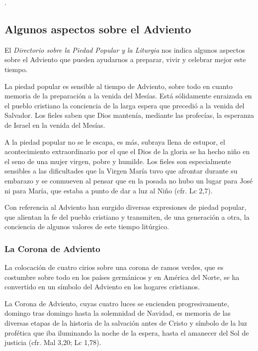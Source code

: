 \begin{introstyle}
	.
	
	\subsection{Algunos aspectos sobre el Adviento}
	
	El \emph{Directorio sobre la Piedad Popular y la Liturgia} nos indica algunos aspectos sobre el Adviento que pueden ayudarnos a preparar, vivir y celebrar mejor este tiempo\label{fn8}.
	
	La piedad popular es sensible al tiempo de Adviento, sobre todo en cuanto memoria de la preparación a la venida del Mesías. Está sólidamente enraizada en el pueblo cristiano la conciencia de la larga espera que precedió a la venida del Salvador. Los fieles saben que Dios
	mantenía, mediante las profecías, la esperanza de Israel en la venida del Mesías.
	
	A la piedad popular no se le escapa, es más, subraya llena de estupor, el acontecimiento extraordinario por el que el Dios de la gloria se ha hecho niño en el seno de una mujer virgen, pobre y humilde. Los fieles	son especialmente sensibles a las dificultades que la Virgen María tuvo que afrontar durante su embarazo y se conmueven al pensar que en la
	posada no hubo un lugar para José ni para María, que estaba a punto de dar a luz al Niño (cfr. Lc 2,7).
	
	Con referencia al Adviento han surgido diversas expresiones de piedad popular, que alientan la fe del pueblo cristiano y transmiten, de una generación a otra, la conciencia de algunos valores de este tiempo litúrgico.
	
	
	\subsubsection{La Corona de Adviento}
	
	La colocación de cuatro cirios sobre una corona de ramos verdes, que es costumbre sobre todo en los países germánicos y en América del Norte, se ha convertido en un símbolo del Adviento en los hogares cristianos.
	
	La Corona de Adviento, cuyas cuatro luces se encienden progresivamente,	domingo tras domingo hasta la solemnidad de Navidad, es memoria de las diversas etapas de la historia de la salvación antes de Cristo y símbolo	de la luz profética que iba iluminando la noche de la espera, hasta el amanecer del Sol de justicia (cfr. Mal 3,20; Lc 1,78).
	

\end{introstyle}
